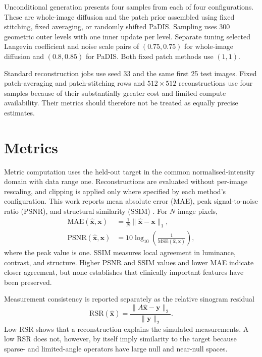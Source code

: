 Unconditional generation presents four samples from each of four configurations. These are whole-image diffusion and the patch prior assembled using fixed stitching, fixed averaging, or randomly shifted PaDIS. Sampling uses 300 geometric outer levels with one inner update per level. Separate tuning selected Langevin coefficient and noise scale pairs of $(0.75,0.75)$ for whole-image diffusion and $(0.8,0.85)$ for PaDIS. Both fixed patch methods use $(1,1)$.

Standard reconstruction jobs use seed 33 and the same first 25 test images. Fixed patch-averaging and patch-stitching rows and $512\times512$ reconstructions use four samples because of their substantially greater cost and limited compute availability. Their metrics should therefore not be treated as equally precise estimates.

\section{Metrics}

Metric computation uses the held-out target in the common normalised-intensity domain with data range one. Reconstructions are evaluated without per-image rescaling, and clipping is applied only where specified by each method's configuration. This work reports mean absolute error (MAE), peak signal-to-noise ratio (PSNR), and structural similarity (SSIM) \cite{wang_image_2004}. For $N$ image pixels,
\begin{align}
\mathrm{MAE}(\hat{\mathbf{x}},\mathbf{x})
&=\frac{1}{N}\lVert\hat{\mathbf{x}}-\mathbf{x}\rVert_1,\\
\mathrm{PSNR}(\hat{\mathbf{x}},\mathbf{x})
&=10\log_{10}\left(\frac{1}{\mathrm{MSE}(\hat{\mathbf{x}},\mathbf{x})}\right),
\end{align}
where the peak value is one. SSIM measures local agreement in luminance, contrast, and structure. Higher PSNR and SSIM values and lower MAE indicate closer agreement, but none establishes that clinically important features have been preserved.

Measurement consistency is reported separately as the relative sinogram residual
\begin{equation}
\mathrm{RSR}(\hat{\mathbf{x}})
=
\frac{\lVert A\hat{\mathbf{x}}-\mathbf{y}\rVert_2}
{\lVert\mathbf{y}\rVert_2}.
\end{equation}
Low RSR shows that a reconstruction explains the simulated measurements. A low RSR does not, however, by itself imply similarity to the target because sparse- and limited-angle operators have large null and near-null spaces.


